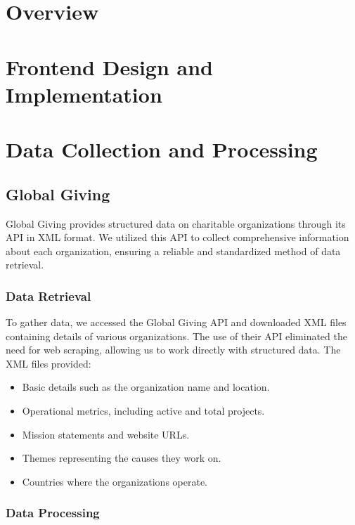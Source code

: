\documentclass[unicode,9pt,a4paper,oneside,numbers=endperiod,openany]{scrartcl}
\begin{document}
\setassignment
{}

\newline

\section{Overview}

\section{Frontend Design and Implementation}

\section{Data Collection and Processing}

\subsection{Global Giving}
Global Giving provides structured data on charitable organizations through its API in XML format. We utilized this API to collect comprehensive information about each organization, ensuring a reliable and standardized method of data retrieval.

\subsubsection{Data Retrieval}
To gather data, we accessed the Global Giving API and downloaded XML files containing details of various organizations. The use of their API eliminated the need for web scraping, allowing us to work directly with structured data. The XML files provided:
\begin{itemize}
\item Basic details such as the organization name and location.
\item Operational metrics, including active and total projects.
\item Mission statements and website URLs.
\item Themes representing the causes they work on.
\item Countries where the organizations operate.
\end{itemize}

\subsubsection{Data Processing}
\end{document}
